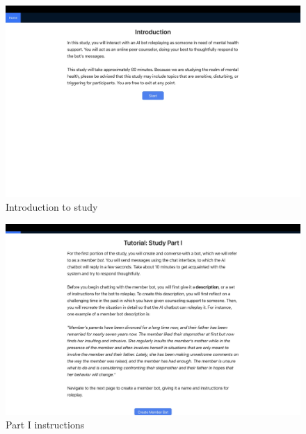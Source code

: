 \documentclass[11pt]{article}
\begin{document}
\begin{figure}[ht]
    \centering
    \includegraphics[width=\textwidth]{Study Screenshots/Screen1.jpeg}
    \caption{Introduction to study}
    \label{fig:screen1}
\end{figure}

\begin{figure}[ht]
    \centering
    \includegraphics[width=\textwidth]{Study Screenshots/Screen2.jpeg}
    \caption{Part I instructions}
    \label{fig:screen2}
\end{figure}
\end{document}

